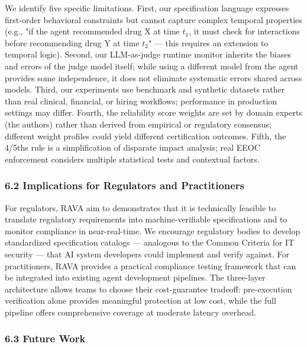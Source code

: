 \documentclass[
]{article}
\begin{document}
We identify five specific limitations. First, our specification language expresses first-order behavioral constraints but cannot capture complex temporal properties (e.g., "if the agent recommended drug X at time $t_1$, it must check for interactions before recommending drug Y at time $t_2$" --- this requires an extension to temporal logic). Second, our LLM-as-judge runtime monitor inherits the biases and errors of the judge model itself; while using a different model from the agent provides some independence, it does not eliminate systematic errors shared across models. Third, our experiments use benchmark and synthetic datasets rather than real clinical, financial, or hiring workflows; performance in production settings may differ. Fourth, the reliability score weights are set by domain experts (the authors) rather than derived from empirical or regulatory consensus; different weight profiles could yield different certification outcomes. Fifth, the 4/5ths rule is a simplification of disparate impact analysis; real EEOC enforcement considers multiple statistical tests and contextual factors.

\hypertarget{62-implications-for-regulators-and-practitioners}{%
\subsubsection{6.2 Implications for Regulators and Practitioners}\label{62-implications-for-regulators-and-practitioners}}

For regulators, RAVA aim to demonstrates that it is technically feasible to translate regulatory requirements into machine-verifiable specifications and to monitor compliance in near-real-time. We encourage regulatory bodies to develop standardized specification catalogs --- analogous to the Common Criteria for IT security --- that AI system developers could implement and verify against. For practitioners, RAVA provides a practical compliance testing framework that can be integrated into existing agent development pipelines. The three-layer architecture allows teams to choose their cost-guarantee tradeoff: pre-execution verification alone provides meaningful protection at low cost, while the full pipeline offers comprehensive coverage at moderate latency overhead.

\hypertarget{63-future-work}{%
\subsubsection{6.3 Future Work}\label{63-future-work}}
\end{document}
